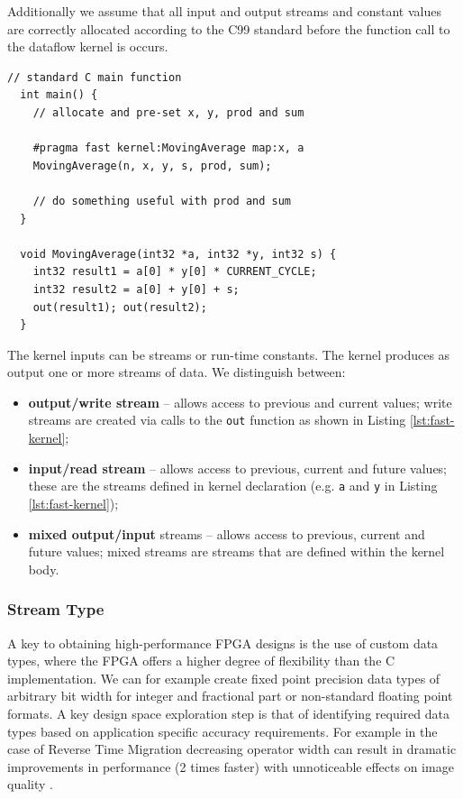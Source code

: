 Additionally we assume that all input and output streams and constant
values are correctly allocated according to the C99 standard before
the function call to the dataflow kernel is occurs.

\begin{lstlisting}[caption={Simple \FAST{} dataflow kernel.}, label={lst:fast-kernel}]
  // standard C main function
  int main() {
    // allocate and pre-set x, y, prod and sum

    #pragma fast kernel:MovingAverage map:x, a
    MovingAverage(n, x, y, s, prod, sum);

    // do something useful with prod and sum
  }

  void MovingAverage(int32 *a, int32 *y, int32 s) {
    int32 result1 = a[0] * y[0] * CURRENT_CYCLE;
    int32 result2 = a[0] + y[0] + s;
    out(result1); out(result2);
  }
\end{lstlisting}

The kernel inputs can be streams or run-time constants. The kernel
produces as output one or more streams of data. We distinguish between:

\begin{itemize}
\item \textbf{output/write stream}  -- allows access to previous and
  current values; write streams are created via calls to the
  \texttt{out} function as shown in Listing \ref{lst:fast-kernel};
\item \textbf{input/read stream} -- allows access to previous, current
  and future values; these are the streams defined in kernel
  declaration (e.g. \texttt{a} and \texttt{y} in Listing
  \ref{lst:fast-kernel});
\item \textbf{mixed output/input} streams -- allows access to
  previous, current and future values; mixed streams are streams that
  are defined within the kernel body.
\end{itemize}

\subsubsection{Stream Type}
A key to obtaining high-performance FPGA designs is the use of custom
data types, where the FPGA offers a higher degree of flexibility than
the C implementation. We can for example create fixed point precision
data types of arbitrary bit width for integer and fractional part or
non-standard floating point formats. A key design space exploration
step is that of identifying required data types based on application
specific accuracy requirements. For example in the case of Reverse
Time Migration decreasing operator width can result in dramatic
improvements in performance (2 times faster) with unnoticeable effects
on image quality \cite{hfu2010accelerate}.

